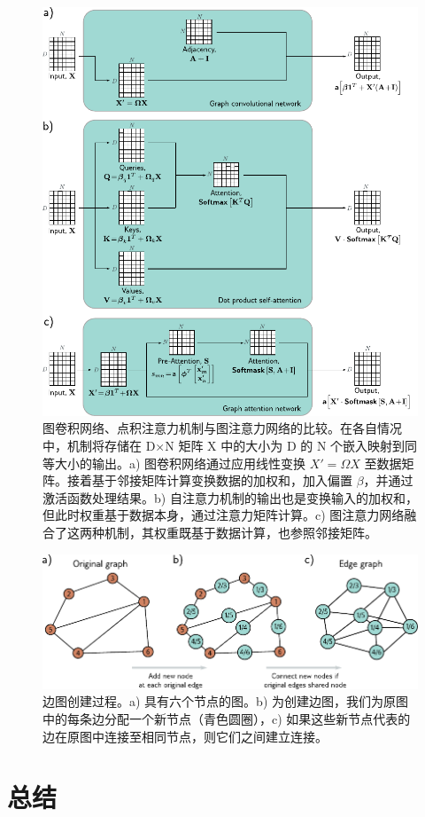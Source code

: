 \documentclass[lang=cn,newtx,10pt,scheme=chinese]{elegantbook}
\begin{document}
\begin{figure}[ht!]
\centering
\includegraphics[width=0.7\linewidth]{PDFFigures/UDLChap13PDF/GraphTransformer.pdf}
\caption{图卷积网络、点积注意力机制与图注意力网络的比较。在各自情况中，机制将存储在 D×N 矩阵 X 中的大小为 D 的 N 个嵌入映射到同等大小的输出。a) 图卷积网络通过应用线性变换 \(X \prime = \Omega X\) 至数据矩阵。接着基于邻接矩阵计算变换数据的加权和，加入偏置 \(\beta\)，并通过激活函数处理结果。b) 自注意力机制的输出也是变换输入的加权和，但此时权重基于数据本身，通过注意力矩阵计算。c) 图注意力网络融合了这两种机制，其权重既基于数据计算，也参照邻接矩阵。}
\end{figure}



\begin{figure}[ht!]
\centering
\includegraphics[width=0.7\linewidth]{PDFFigures/UDLChap13PDF/GraphAdjoint.pdf}
\caption{边图创建过程。a) 具有六个节点的图。b) 为创建边图，我们为原图中的每条边分配一个新节点（青色圆圈），c) 如果这些新节点代表的边在原图中连接至相同节点，则它们之间建立连接。}
\end{figure}

\section{总结}
\end{document}
